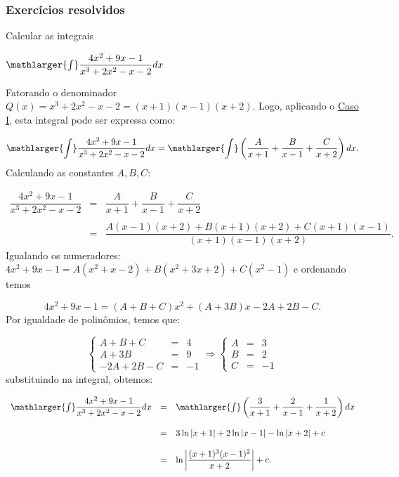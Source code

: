 \cleardoublepage\documentclass[../main.tex]{subfiles}
\begin{document}

\subsubsection{Exercícios resolvidos}
\begin{exeresol}
  Calcular as integrais\\
  \begin{compactenum}[a)]
  \item \(\mathlarger{\int}\dfrac{4x^2+9x-1}{x^3+2x^2-x-2} dx\)\\

\begin{solution}
Fatorando o denominador \(Q(x)=x^3+2x^2-x-2 = (x+1)(x-1)(x+2)\). Logo, aplicando o \hyperlink{FracParcCasoI}{Caso I}, esta integral pode ser expressa como:

\[ \mathlarger{\int}\dfrac{4x^2+9x-1}{x^3+2x^2-x-2} dx =\mathlarger{\int}\left(\dfrac{A}{x+1}+ \dfrac{B}{x-1}+ \dfrac{C}{x+2}\right) dx. \]
Calculando as constantes \(A,B,C\):

\[ \begin{array}{rcl} \dfrac{4x^2+9x-1}{x^3+2x^2-x-2}& =& \dfrac{A}{x+1}+ \dfrac{B}{x-1}+ \dfrac{C}{x+2}\\ \\ & = &\dfrac{A(x-1)(x+2)+B(x+1)(x+2)+C(x+1)(x-1)}{(x+1)(x-1)(x+2)}. \end{array} \]
Igualando os numeradores: \(4x^2+9x-1 = A(x^2+x-2) +B(x^2+3x+2)+C(x^2-1)\) e ordenando temos

\[ 4x^2+9x-1=(A+B+C)x^2 +(A+3B)x -2A+2B-C. \]
Por igualdade de polinômios, temos que:

\[ \left\{ \begin{array}{rcr} A+B+C &=&4\\ A+3B&=&9\\ -2A+2B-C&=&-1 \end{array} \right. \Rightarrow \left\{ \begin{array}{ccr} A&=&3\\ B&=&2\\ C&=&-1 \end{array} \right. \]
substituindo na integral, obtemos:

\[ \begin{array}{rcl} \mathlarger{\int}\dfrac{4x^2+9x-1}{x^3+2x^2-x-2} dx &=&\mathlarger{\int}\left(\dfrac{3}{x+1}+ \dfrac{2}{x-1}+ \dfrac{1}{x+2}\right) dx\\ \\ &=& 3\ln|x+1|+2\ln|x-1|-\ln|x+2|+c\\ \\ &=& \ln\left|\dfrac{(x+1)^3(x-1)^2}{x+2} \right|+c. \end{array} \]


\end{solution}
\end{compactenum}
\end{exeresol}
\end{document}
